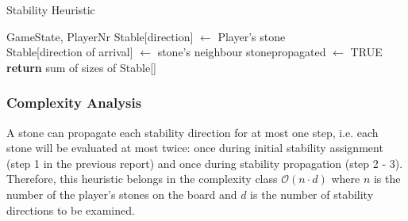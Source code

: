 \documentclass[a4paper,12pt]{article}
\begin{document}
    \begin{algorithm}[H]
        \caption{Stability Heuristic}\label{Stable Heuristic}
        \begin{algorithmic}
            \Require GameState, PlayerNr
            \State Stable[direction] $\gets$ Player's stone
            \EndIf
            \EndFor
            \EndFor
            \\
            \State Stable[direction of arrival] $\gets$ stone's neighbour
            \EndIf
            stone\textunderscore propagated $\gets$ TRUE 
            \\
            \EndFor
            \EndFor
            \EndWhile
            \textbf{return} sum of sizes of Stable[]
            \EndFunction
        \end{algorithmic}
    \end{algorithm}
    \subsubsection{Complexity Analysis}
    A stone can propagate each stability direction for at most one step, i.e. each stone will be evaluated at most twice: once during initial stability assignment (step 1 in the previous report) and once during stability propagation (step 2 - 3). Therefore, this heuristic belongs in the complexity class $\mathcal{O}(n \cdot d)$ where $n$ is the number of the player's stones on the board and $d$ is the number of stability directions to be examined. 
\end{document}

